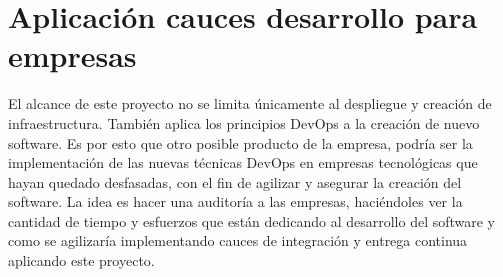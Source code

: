 \section{Aplicación cauces desarrollo para empresas}
\begin{text}
        El alcance de este proyecto no se limita únicamente al despliegue y creación de infraestructura. También aplica los principios DevOps a la creación de nuevo software. Es por esto que otro posible producto de la empresa, podría ser la implementación de las nuevas técnicas DevOps en empresas tecnológicas que hayan quedado desfasadas, con el fin de agilizar y asegurar la creación del software. La idea es hacer una auditoría a las empresas, haciéndoles ver la cantidad de tiempo y esfuerzos que están dedicando al desarrollo del software y como se agilizaría implementando cauces de integración y entrega continua aplicando este proyecto.
\end{text}